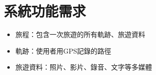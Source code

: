 \section{系統功能需求}

\begin{itemize}
  \item 旅程：包含一次旅遊的所有軌跡、旅遊資料
  \item 軌跡：使用者用GPS記錄的路徑
  \item 旅遊資料：照片、影片、錄音、文字等多媒體
\end{itemize}











